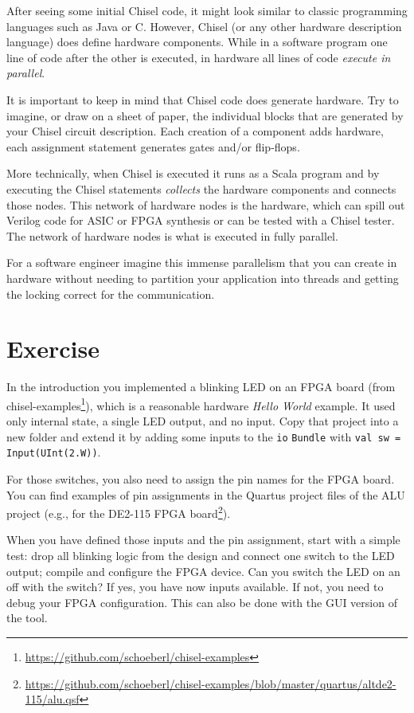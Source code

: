 \documentclass[%
    10pt,
    headinclude, footexclude,
    openright, %
    notitlepage,
    cleardoubleempty,
    headsepline,
    pointlessnumbers,
    bibtotoc, idxtotoc,
    ]{scrbook}
\newcommand{\code}[1]{{\small{\texttt{#1}}}}
\newcommand{\myref}[2]{\href{#1}{#2}}
\renewcommand{\myref}[2]{{#2}{\footnote{\url{#1}}}}
\begin{document}
After seeing some initial Chisel code, it might look similar to classic programming
languages such as Java or C. However, Chisel (or any other hardware description
language) does define hardware components. While in a software program one
line of code after the other is executed, in hardware all lines of code
\emph{execute in parallel}.

It is important to keep in mind that Chisel code does generate hardware.
Try to imagine, or draw on a sheet of paper, the individual blocks that
are generated by your Chisel circuit description.
Each creation of a component adds hardware, each assignment statement
generates gates and/or flip-flops.

More technically, when Chisel is executed it runs as a Scala program and
by executing the Chisel statements \emph{collects} the hardware components
and connects those nodes. This network of hardware nodes is the hardware,
which can spill out Verilog code for ASIC or FPGA synthesis or can be
tested with a Chisel tester.
The network of hardware nodes is what is executed in fully parallel.

For a software engineer imagine this immense parallelism that you can
create in hardware without needing to partition your application into threads
and getting the locking correct for the communication.


\section{Exercise}

In the introduction you implemented a blinking LED on an FPGA board
(from \myref{https://github.com/schoeberl/chisel-examples}{chisel-examples}), which is a reasonable
hardware \emph{Hello World} example. It used only internal state, a single LED output, and no input.
Copy that project into a new folder and extend it by adding some inputs to the \code{io} \code{Bundle}
with \code{val sw = Input(UInt(2.W))}.


\noindent For those switches, you also need to assign the pin names for the FPGA board.
You can find examples of pin assignments in the Quartus project files of the ALU project
(e.g., for the \myref{https://github.com/schoeberl/chisel-examples/blob/master/quartus/altde2-115/alu.qsf}{DE2-115
FPGA board}).

When you have defined those inputs and the pin assignment, start with a simple test:
drop all blinking logic from the design and connect one switch to the LED output;
compile and configure the FPGA device. Can you switch the LED on an off with the switch?
If yes, you have now inputs available. If not, you need to debug your FPGA configuration.
This can also be done with the GUI version of the tool.
\end{document}

